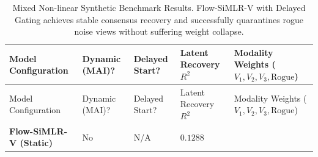 \documentclass[
  letterpaper,
]{report}
\begin{document}
\begin{longtable}[]{@{}
  >{\raggedright\arraybackslash}p{}
  >{\centering\arraybackslash}p{}
  >{\centering\arraybackslash}p{}
  >{\centering\arraybackslash}p{}
  >{\raggedright\arraybackslash}p{}@{}}
\caption{Mixed Non-linear Synthetic Benchmark Results. Flow-SiMLR-V with
Delayed Gating achieves stable consensus recovery and successfully
quarantines rogue noise views without suffering weight
collapse.}\label{tbl-mixed-synthetic-results}\tabularnewline
\toprule\noalign{}
\begin{minipage}[b]{\linewidth}\raggedright
Model Configuration
\end{minipage} & \begin{minipage}[b]{\linewidth}\centering
Dynamic (MAI)?
\end{minipage} & \begin{minipage}[b]{\linewidth}\centering
Delayed Start?
\end{minipage} & \begin{minipage}[b]{\linewidth}\centering
Latent Recovery \(R^2\)
\end{minipage} & \begin{minipage}[b]{\linewidth}\raggedright
Modality Weights (\(V_1, V_2, V_3, \text{Rogue}\))
\end{minipage} \\
\midrule\noalign{}
\endfirsthead
\toprule\noalign{}
\begin{minipage}[b]{\linewidth}\raggedright
Model Configuration
\end{minipage} & \begin{minipage}[b]{\linewidth}\centering
Dynamic (MAI)?
\end{minipage} & \begin{minipage}[b]{\linewidth}\centering
Delayed Start?
\end{minipage} & \begin{minipage}[b]{\linewidth}\centering
Latent Recovery \(R^2\)
\end{minipage} & \begin{minipage}[b]{\linewidth}\raggedright
Modality Weights (\(V_1, V_2, V_3, \text{Rogue}\))
\end{minipage} \\
\midrule\noalign{}
\endhead
\bottomrule\noalign{}
\endlastfoot
\textbf{Flow-SiMLR-V (Static)} & No & N/A & \(0.1288\) &

\end{longtable}
\end{document}

